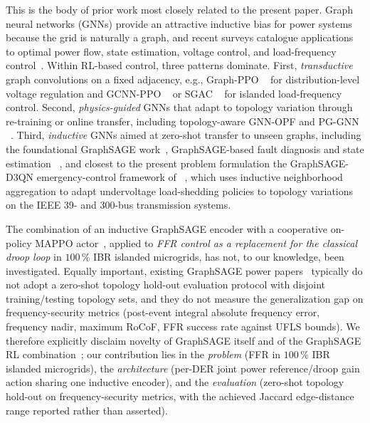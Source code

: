 \documentclass[lettersize,journal]{IEEEtran}
\begin{document}
This is the body of prior work most closely related to the present paper. Graph neural networks (GNNs) provide an attractive inductive bias for power systems because the grid is naturally a graph, and recent surveys catalogue applications to optimal power flow, state estimation, voltage control, and load-frequency control~\cite{liao2021gnn,liu2022topology}. Within RL-based control, three patterns dominate.
First, \emph{transductive} graph convolutions on a fixed adjacency, e.g., Graph-PPO ~\cite{wang2023graphppo} for distribution-level voltage regulation and GCNN-PPO ~\cite{guo2024gcnnppo} or SGAC ~\cite{guo2024ldlfc} for islanded load-frequency control.
Second, \emph{physics-guided} GNNs that adapt to topology variation through re-training or online transfer, including topology-aware GNN-OPF and PG-GNN ~\cite{liu2022topology,yang2024pggnn}.
Third, \emph{inductive} GNNs aimed at zero-shot transfer to unseen graphs, including the foundational GraphSAGE work~\cite{hamilton2017graphsage}, GraphSAGE-based fault diagnosis and state estimation ~\cite{CHEN2023930}, and closest to the present problem formulation the GraphSAGE-D3QN emergency-control framework of ~\cite{pei2023graphsage}, which uses inductive neighborhood aggregation to adapt undervoltage load-shedding policies to topology variations on the IEEE 39- and 300-bus transmission systems.

The combination of an inductive GraphSAGE encoder with a cooperative on-policy MAPPO actor~\cite{yu2022mappoeffective}, applied
to \emph{FFR control as a replacement for the classical droop loop} in $100$\,\% IBR islanded microgrids, has not, to our knowledge, been investigated. Equally important, existing GraphSAGE power papers~\cite{pei2023graphsage} typically do not adopt a zero-shot topology hold-out evaluation protocol with disjoint training/testing topology sets, and they do not measure the generalization gap on frequency-security metrics (post-event integral absolute frequency error, frequency nadir, maximum RoCoF, FFR success rate against UFLS bounds). We therefore explicitly disclaim novelty of GraphSAGE itself and of the GraphSAGE RL combination~\cite{pei2023graphsage}; our contribution lies in the \emph{problem} (FFR in $100$\,\% IBR islanded microgrids), the \emph{architecture} (per-DER joint power reference/droop gain action sharing one inductive encoder), and the \emph{evaluation} (zero-shot topology hold-out on frequency-security metrics, with the achieved Jaccard edge-distance range reported rather than asserted).

\end{document}
